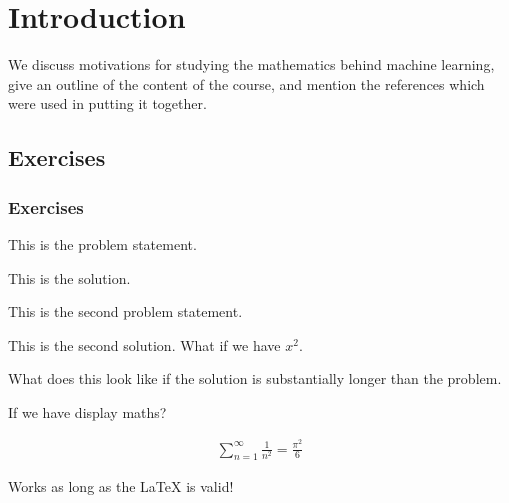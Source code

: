 \chapter{Introduction}

\begin{chout}
	We discuss motivations for studying the mathematics behind machine learning, give an outline of the content of the course, and mention the references which were used in putting it together.
\end{chout}

\section{Exercises}
\subsection{Exercises \basic}
\begin{exercise}
	\begin{problem}
	This is the problem statement.
	\end{problem}
	\begin{solution}
		This is the solution.
	\end{solution}
\end{exercise}

\begin{exercise}
	\begin{problem}
	This is the second problem statement.
	\end{problem}
	\begin{solution}
		This is the second solution. What if we have $ x^{2} $.

		What does this look like if the solution is substantially longer than the problem.

		If we have display maths?

		\begin{align*}
			\sum_{n=1}^{\infty}{\frac{1}{n^{2}}} = \frac{\pi^{2}}{6}
		\end{align*}

		Works as long as the LaTeX is valid!
	\end{solution}
\end{exercise}

